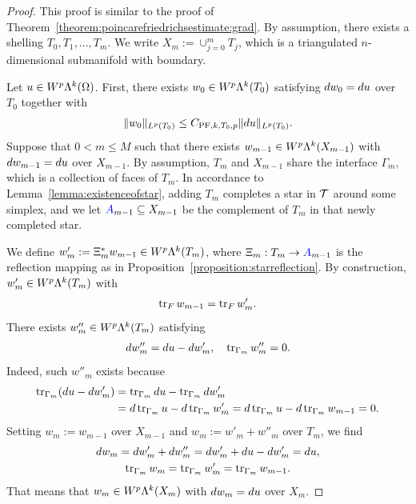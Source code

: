 \documentclass[10pt,letterpaper]{article}
\begin{document}
\begin{proof}
    This proof is similar to the proof of Theorem~\ref{theorem:poincarefriedrichsestimate:grad}.
    By assumption, there exists a shelling $T_0, T_1, \dots, T_m$. 
    We write $X_m := \cup_{j=0}^{m} T_j$, which is a triangulated $n$-dimensional submanifold with boundary.

    Let $u \in W^{p}\Lambda^{k}(\Omega)$. 
    First, there exists $w_0 \in W^{p}\Lambda^{k}(T_{0})$ satisfying $d w_0 = d u$ over $T_{0}$ together with 
    \begin{gather*}
        \| w_0 \|_{L^{p}(T_{0})} \leq C_{{\rm{PF}},k,T_{0},p} \| d u \|_{L^{p}(T_{0})}.
    \end{gather*}
    Suppose that $0 < m \leq M$ such that there exists $w_{m-1} \in W^{p}\Lambda^{k}(X_{m-1})$ 
    with $d w_{m-1} = d u$ over $X_{m-1}$. 
    By assumption, $T_{m}$ and $X_{m-1}$ share the interface $\Gamma_{m}$, which is a collection of faces of $T_{m}$. 
    In accordance to Lemma~\ref{lemma:existenceofstar}, adding $T_{m}$ completes a star in ${\mathcal T}$ around some simplex, and we let ${\color{blue}A}_{m-1} \subseteq X_{m-1}$ be the complement of $T_{m}$ in that newly completed star. 
    
    We define $w'_{m} :=  \Xi_{m}^{\ast} w_{m-1} \in W^{p}\Lambda^{k}(T_{m})$,
    where $\Xi_{m} : T_{m} \rightarrow {\color{blue}A}_{m-1}$ is the reflection mapping
    as in Proposition~\ref{proposition:starreflection}. 
    By construction, $w'_{m} \in W^{p}\Lambda^{k}(T_{m})$ with 
    \begin{align*}
        \operatorname{tr}_F w_{m-1} = \operatorname{tr}_F w'_{m}
        . 
    \end{align*}
    There exists $w''_{m} \in W^{p}\Lambda^{k}(T_{m})$ satisfying 
    \begin{align*}
        d w''_{m} = d u - d w'_{m}, 
        \quad 
        \operatorname{tr}_{\Gamma_{m}} w''_{m} = 0.
    \end{align*}
    Indeed, such $w''_{m}$ exists because 
    \begin{align*}
        \operatorname{tr}_{\Gamma_{m}}( d u - d w'_{m} ) 
        &= 
        \operatorname{tr}_{\Gamma_{m}} d u - \operatorname{tr}_{\Gamma_{m}} d w'_{m}
        \\&= 
        d \operatorname{tr}_{\Gamma_{m}} u - d \operatorname{tr}_{\Gamma_{m}} w'_{m}
        = 
        d \operatorname{tr}_{\Gamma_{m}} u - d \operatorname{tr}_{\Gamma_{m}} w_{m-1}
        = 
        0
        .
    \end{align*}
    Setting $w_{m} := w_{m-1}$ over $X_{m-1}$ and $w_{m} := w'_{m} + w''_{m}$ over $T_{m}$, 
    we find 
    \begin{gather*}
        d w_{m} = d w'_{m} + d w''_{m} = d w'_{m} + d u - d w'_{m} = d u,
        \\
        \operatorname{tr}_{\Gamma_{m}} w_{m} = \operatorname{tr}_{\Gamma_{m}} w'_{m} = \operatorname{tr}_{\Gamma_{m}} w_{m-1}.
    \end{gather*}
    That means that $w_{m} \in W^{p}\Lambda^{k}(X_{m})$ with $d w_{m} = d u$ over $X_{m}$. 
    

\end{proof}
\end{document}
